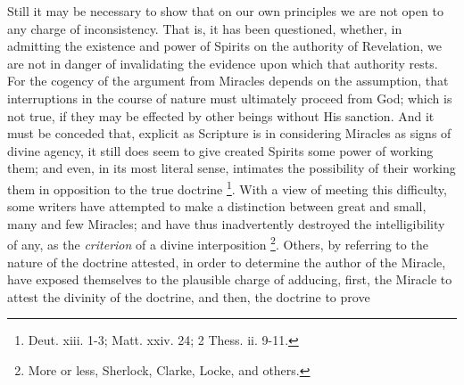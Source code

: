 Still it may be necessary to show that on our own
principles we are not open to any charge of inconsistency. That is, it
has been questioned, whether, in admitting the existence and power of
Spirits on the authority of Revelation, we are not in danger of
invalidating the evidence upon which that authority rests. For the
cogency of the argument from Miracles depends on the assumption, that
interruptions in the course of nature must ultimately proceed from
God; which is not true, if they may be effected by other beings
without His sanction. And it must be conceded that, explicit as
Scripture is in considering Miracles as signs of divine agency, it
still does seem to give created Spirits some power of working
them; and even, in its most literal sense, intimates the possibility of
their working them in opposition to the true doctrine \footnote{Deut. xiii. 1-3; Matt. xxiv. 24; 2 Thess. ii. 9-11.}. With a view of meeting this difficulty, some writers have
attempted to make a distinction between great and small, many and few
Miracles; and have thus inadvertently destroyed the intelligibility of
any, as the \emph{criterion} of a divine interposition \footnote{More or less, Sherlock, Clarke, Locke, and others.}. Others, by referring to the nature of the doctrine attested,
in order to determine the author of the Miracle, have exposed
themselves to the plausible charge of adducing, first, the Miracle to
attest the divinity of the doctrine, and then, the doctrine to prove
